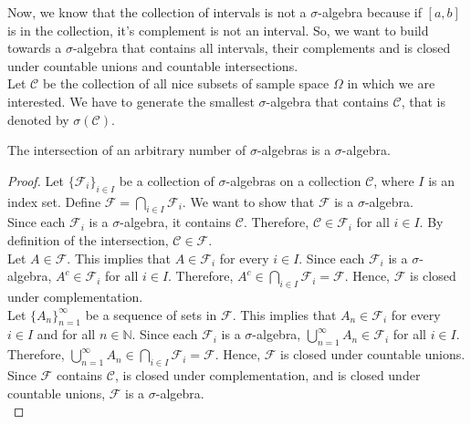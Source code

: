 Now, we know that the collection of intervals is not a $\sigma$-algebra because if $[a, b]$ is in the collection, it's complement is not an interval. So, we want to build towards a $\sigma$-algebra that contains all intervals, their complements and is closed under countable unions and countable intersections. \\

Let $\mathcal{C}$ be the collection of all nice subsets of sample space $\Omega$ in which we are interested. We have to generate the smallest $\sigma$-algebra that contains $\mathcal{C}$, that is denoted by $\sigma(\mathcal{C})$. 

\begin{theorem}
   The intersection of an arbitrary number of $\sigma$-algebras is a $\sigma$-algebra.
\end{theorem}

\begin{proof}
   Let $\{ \mathcal{F}_i \}_{i \in I}$ be a collection of $\sigma$-algebras on a collection $\mathcal{C}$, where $I$ is an index set. Define $\mathcal{F} = \bigcap_{i \in I} \mathcal{F}_i$. We want to show that $\mathcal{F}$ is a $\sigma$-algebra.\\

   Since each $\mathcal{F}_i$ is a $\sigma$-algebra, it contains $\mathcal{C}$. Therefore, $\mathcal{C} \in \mathcal{F}_i$ for all $i \in I$. By definition of the intersection, $\mathcal{C} \in \mathcal{F}$.\\

   Let $A \in \mathcal{F}$. This implies that $A \in \mathcal{F}_i$ for every $i \in I$. Since each $\mathcal{F}_i$ is a $\sigma$-algebra, $A^c \in \mathcal{F}_i$ for all $i \in I$. Therefore, $A^c \in \bigcap_{i \in I} \mathcal{F}_i = \mathcal{F}$. Hence, $\mathcal{F}$ is closed under complementation.\\

   Let $\{A_n\}_{n=1}^{\infty}$ be a sequence of sets in $\mathcal{F}$. This implies that $A_n \in \mathcal{F}_i$ for every $i \in I$ and for all $n \in \mathbb{N}$. Since each $\mathcal{F}_i$ is a $\sigma$-algebra, $\bigcup_{n=1}^{\infty} A_n \in \mathcal{F}_i$ for all $i \in I$. Therefore, $\bigcup_{n=1}^{\infty} A_n \in \bigcap_{i \in I} \mathcal{F}_i = \mathcal{F}$. Hence, $\mathcal{F}$ is closed under countable unions.\\

   Since $\mathcal{F}$ contains $\mathcal{C}$, is closed under complementation, and is closed under countable unions, $\mathcal{F}$ is a $\sigma$-algebra.\\
\end{proof}


